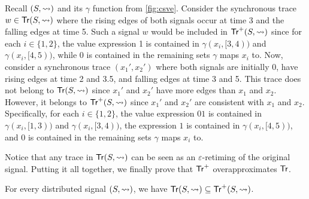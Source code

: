 \begin{example} \label{ex:overapx}
	Recall \((S, {\rightsquigarrow})\) and its \(\gamma\) function from \cref{fig:csve}.
	Consider the synchronous trace \(w \in \mathsf{Tr}(S, {\rightsquigarrow})\) where the rising edges of both signals occur at time 3 and the falling edges at time 5.
	Such a signal \( w \) would be included in \(\mathsf{Tr}^+(S,{\rightsquigarrow})\) since for each \(i \in \{1,2\}\), the value expression 1 is contained in \(\gamma(x_i, [3,4))\) and \(\gamma(x_i, [4,5))\), while 0 is contained in the remaining sets \(\gamma\) maps \(x_i\) to.
	Now, consider a synchronous trace \((x_1', x_2')\) where both signals are initially 0, have rising edges at time 2 and 3.5, and falling edges at time 3 and 5.
	This trace does not belong to \(\mathsf{Tr}(S, {\rightsquigarrow})\) since \(x_1'\) and \(x_2'\) have more edges than \(x_1\) and \(x_2\).
	However, it belongs to \(\mathsf{Tr}^+(S,{\rightsquigarrow})\) since \(x_1'\) and \(x_2'\) are consistent with \(x_1\) and \(x_2\).
	Specifically, for each \(i \in \{1,2\}\), the value expression \(01\) is contained in \(\gamma(x_i, [1,3))\) and \(\gamma(x_i, [3,4))\), the expression \(1\) is contained in \(\gamma(x_i, [4,5))\), and 0 is contained in the remaining sets \(\gamma\) maps \(x_i\) to.
\end{example}

Notice that any trace in $\mathsf{Tr}(S,\rightsquigarrow)$ can be seen as an $\varepsilon$-retiming of the original signal.
Putting it all together, we finally prove that $\mathsf{Tr}^+$ overapproximates $\mathsf{Tr}$.

\begin{lemma} \label{cl:trsound}
	For every distributed signal $(S,{\rightsquigarrow})$, we have $\mathsf{Tr}(S,{\rightsquigarrow}) \subseteq \mathsf{Tr}^+(S,{\rightsquigarrow})$.
\end{lemma}

